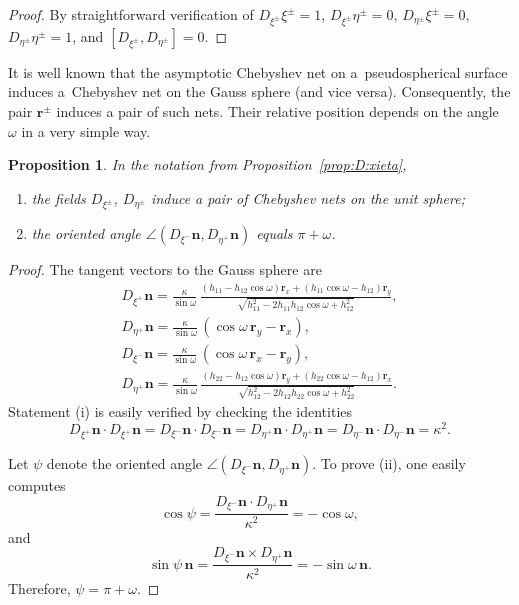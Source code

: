 \documentclass[pdftex]{sigma}
\let\ve\mathbf
\def\rmref#1{{\rm\ref{#1}}}
\def\h#1#2{h_{#1#2}}
\def\f{\omega}
\def\k{\kappa}
\newtheorem{Proposition}[Theorem]{Proposition}
 { \theoremstyle{definition}
\newtheorem{construction}[Theorem]{Construction}
\newtheorem{Definition}[Theorem]{Definition}
\newtheorem{Example}[Theorem]{Example}
\newtheorem{Remark}[Theorem]{Remark} }
\numberwithin{equation}{section}
\begin{document}
\begin{proof}
By straightforward verification of
$D_{\xi^\pm} \xi^\pm = 1$,  $D_{\xi^\pm} \eta^\pm = 0$,
$D_{\eta^\pm} \xi^\pm = 0$, $D_{\eta^\pm} \eta^\pm = 1$,
and $[D_{\xi^\pm}, D_{\eta^\pm}] = 0$.
\end{proof}

It is well known that the asymptotic Chebyshev net on
a~pseudospherical surface induces a~Chebyshev net on the Gauss
sphere (and vice versa).
Consequently, the pair $\ve r^\pm$ induces a pair of such nets.
Their relative position depends on the angle $\omega$ in a very simple way.

\begin{Proposition}
\label{prop:Chpair}
In the notation from Proposition~\rmref{prop:D:xieta},
\begin{enumerate}\itemsep=0pt
\item[{\rm (i)}] the fields $D_{\xi^\pm}$, $D_{\eta^\pm}$ induce a pair of Chebyshev
nets on the unit sphere{\/\rm;}

\item[{\rm (ii)}]
the oriented angle $\angle(D_{\xi^-} \ve n, D_{\eta^+} \ve n)$
equals $\pi + \omega$.
\end{enumerate}
\end{Proposition}

\begin{proof}
The tangent vectors to the Gauss sphere are
\begin{gather*}
D_{\xi^+} \ve n
 = \frac{\k}{\sin\omega}\,
   \frac{(\h11 - \h12 \cos\omega) \ve r_x
      + (\h11 \cos\omega - \h12) \ve r_y}
   {\sqrt{\h11^2 - 2 \h11 \h12 \cos\omega + \h12^2}},
\\
D_{\eta^+} \ve n
 = \frac{\k}{\sin\omega}\,(\cos\omega\,\ve r_y - \ve r_x),
\\
D_{\xi^-} \ve n
  = \frac{\k}{\sin\omega}\,(\cos\omega\,\ve r_x - \ve r_y),
\\
D_{\eta^+} \ve n
 = \frac{\k}{\sin\omega}\,
   \frac{(\h22 - \h12 \cos\omega) \ve r_y
      + (\h22 \cos\omega - \h12) \ve r_x}
   {\sqrt{\h12^2 - 2\h12\h22 \cos\f + \h22^2}}.
\end{gather*}
Statement (i) is easily verified by checking the identities
\[
D_{\xi^+} \ve n \cdot D_{\xi^+} \ve n
 = D_{\xi^-} \ve n \cdot D_{\xi^-} \ve n
 = D_{\eta^+} \ve n \cdot D_{\eta^+} \ve n
 = D_{\eta^-} \ve n \cdot D_{\eta^-} \ve n = \k^2.
\]

Let $\psi$ denote the oriented angle $\angle(D_{\xi^-} \ve n, D_{\eta^+} \ve n)$.
To prove (ii), one easily computes
\[
\cos\psi
 = \frac{D_{\xi^-} \ve n \cdot D_{\eta^+} \ve n}{\k^2}
 = -{\cos\omega},
\]
and
\[
\sin\psi\,\ve n
 = \frac{D_{\xi^-} \ve n \times D_{\eta^+} \ve n}{\k^2}
 = -{\sin\omega}\, \ve n.
\]
Therefore,  $\psi = \pi + \omega$.
\end{proof}
\end{document}
